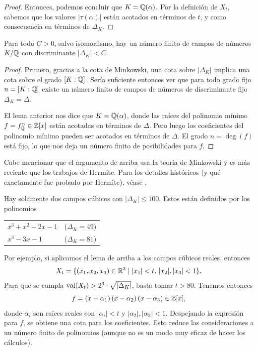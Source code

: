 \begin{lema}
\begin{proof}
    Entonces, podemos concluir que $K = \mathbb{Q} (\alpha)$. Por la defnición de
    $X_t$, sabemos que los valores $|\tau (\alpha)|$ están acotados en términos
    de $t$, y como consecuencia en términos de $\Delta_K$.
  \end{proof}
\end{lema}

\begin{teorema}[Hermite]
  Para todo $C > 0$, salvo isomorfismo, hay un número finito de campos de
  números $K/\mathbb{Q}$ con discriminante $|\Delta_K| < C$.

  \begin{proof}
    Primero, gracias a la cota de Minkowski, una cota sobre $|\Delta_K|$ implica
    una cota sobre el grado $[K : \mathbb{Q}]$. Sería suficiente entonces ver que para
    todo grado fijo $n = [K : \mathbb{Q}]$ existe un número finito de campos de números
    de discriminante fijo $\Delta_K = \Delta$.

    El lema anterior nos dice que $K = \mathbb{Q} (\alpha)$, donde las raíces del
    polinomio mínimo $f = f^\alpha_{\mathbb{Q}} \in \mathbb{Z} [x]$ están acotadas en términos
    de $\Delta$. Pero luego los coeficientes del polinomio mínimo pueden ser
    acotados en términos de $\Delta$. El grado $n = \deg (f)$ está fijo, lo que
    nos deja un número finito de posibilidades para $f$.
  \end{proof}
\end{teorema}

Cabe mencionar que el argumento de arriba usa la teoría de Minkowski y es más
reciente que los trabajos de Hermite. Para los detalles históricos (y qué
exactamente fue probado por Hermite), véase
\cite[Chapter~9]{Scharlau-Opolka-1985}.

\begin{ejemplo}
  Hay solamente dos campos cúbicos con $|\Delta_K| \le 100$. Estos están
  definidos por los polinomios
  \begin{center}
    \begin{tabular}{ll}
      $x^3 + x^2 - 2x - 1$ & ($\Delta_K = 49$) \\
      $x^3 - 3x - 1$ & ($\Delta_K = 81$)
    \end{tabular}
  \end{center}

  Por ejemplo, si aplicamos el lema de arriba a los campos cúbicos reales,
  entonces
  $$X_t = \{ (x_1,x_2,x_3) \in \mathbb{R}^3 \mid |x_1| < t, \, |x_2|, |x_3| < 1 \}.$$
  Para que se cumpla $\operatorname{vol} (X_t) > 2^3\cdot \sqrt{|\Delta_K|}$, basta tomar
  $t > 80$. Tenemos entonces
  $$f = (x - \alpha_1)\,(x - \alpha_2)\,(x - \alpha_3) \in \mathbb{Z}[x],$$
  donde $\alpha_i$ son raíces reales con $|\alpha_i| < t$ y
  $|\alpha_2|, |\alpha_3| < 1$. Despejando la expresión para $f$, se obtiene una
  cota para los coeficientes. Esto reduce las consideraciones a un número finito
  de polinomios (aunque no es un modo muy eficaz de hacer los cálculos).
\end{ejemplo}


